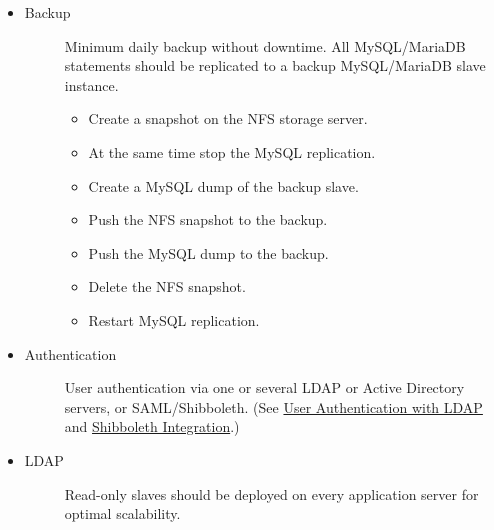 \documentclass[letterpaper,10pt,english]{sphinxmanual}
\begin{document}
\begin{itemize}
\begin{description}
\end{description}

\item {} \begin{description}
\item[{Backup}] \leavevmode
Minimum daily backup without downtime. All MySQL/MariaDB statements should
be replicated to a backup MySQL/MariaDB slave instance.
\begin{itemize}
\item {} 
Create a snapshot on the NFS storage server.

\item {} 
At the same time stop the MySQL replication.

\item {} 
Create a MySQL dump of the backup slave.

\item {} 
Push the NFS snapshot to the backup.

\item {} 
Push the MySQL dump to the backup.

\item {} 
Delete the NFS snapshot.

\item {} 
Restart MySQL replication.

\end{itemize}

\end{description}

\item {} \begin{description}
\item[{Authentication}] \leavevmode
User authentication via one or several LDAP or Active Directory
servers, or SAML/Shibboleth. (See \href{https://doc.owncloud.org/server/9.0/admin\_manual/configuration\_user/user\_auth\_ldap.html}{User Authentication with LDAP} and
\href{https://doc.owncloud.org/server/9.0/admin\_manual/enterprise\_user\_management/user\_auth\_shibboleth.html}{Shibboleth Integration}.)

\end{description}

\item {} \begin{description}
\item[{LDAP}] \leavevmode
Read-only slaves should be deployed on every application server for
optimal scalability.

\end{description}


\end{itemize}
\end{document}
